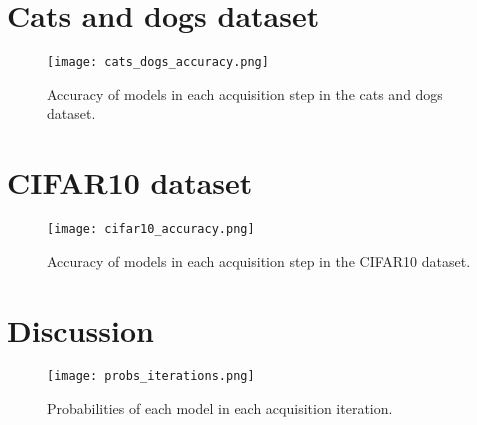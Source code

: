 \section{Cats and dogs dataset}


\begin{figure}[H]
    \centering
    \texttt{[image: cats\_dogs\_accuracy.png]}
    \caption{Accuracy of models in each acquisition step in the cats and dogs dataset.}
    \label{fig:cats_dogs_comparison_active_learning_random}
\end{figure}


\section{CIFAR10 dataset}

\begin{figure}[H]
    \centering
    \texttt{[image: cifar10\_accuracy.png]}
    \caption{Accuracy of models in each acquisition step in the CIFAR10 dataset.}
    \label{fig:cifar10_comparison_active_learning_random}
\end{figure}

\section{Discussion}

\begin{figure}[H]
    \centering
    \texttt{[image: probs\_iterations.png]}
    \caption{Probabilities of each model in each acquisition iteration.}
    \label{fig:probs_iterations}
\end{figure}
